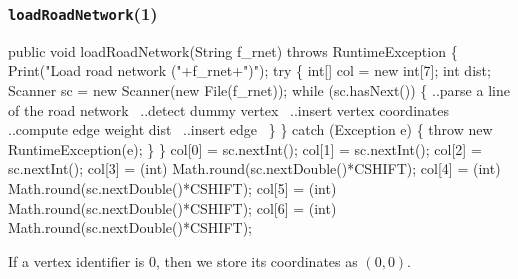 \documentclass{article}
\def\nwendcode{\endtrivlist \endgroup}      %
\let\nwdocspar=\par
\begin{document}
\subsubsection{{\tt{}\protect{}loadRoadNetwork}(1)}
\nwenddocs{}\endmoddef{}
public void loadRoadNetwork(String f_rnet) throws RuntimeException \{
  Print("Load road network ("+f_rnet+")");
  try \{
    int[] col = new int[7];
    int dist;
    Scanner sc = new Scanner(new File(f_rnet));
    while (sc.hasNext()) \{
      \LA{}..parse a line of the road network~{\nwtagstyle{}}\RA{}
      \LA{}..detect dummy vertex~{\nwtagstyle{}}\RA{}
      \LA{}..insert vertex coordinates~{\nwtagstyle{}}\RA{}
      \LA{}..compute edge weight \code{}dist\edoc{}~{\nwtagstyle{}}\RA{}
      \LA{}..insert edge~{\nwtagstyle{}}\RA{}
    \}
  \} catch (Exception e) \{
    throw new RuntimeException(e);
  \}
\}
\eatline
{}\nwendcode{}\endmoddef{}
col[0] = sc.nextInt();
col[1] = sc.nextInt();
col[2] = sc.nextInt();
col[3] = (int) Math.round(sc.nextDouble()*CSHIFT);
col[4] = (int) Math.round(sc.nextDouble()*CSHIFT);
col[5] = (int) Math.round(sc.nextDouble()*CSHIFT);
col[6] = (int) Math.round(sc.nextDouble()*CSHIFT);
\nwendcode{}\nwdocspar
If a vertex identifier is $0$, then we store its coordinates as $(0,0)$.
\nwenddocs{}\endmoddef{}
\end{document}
